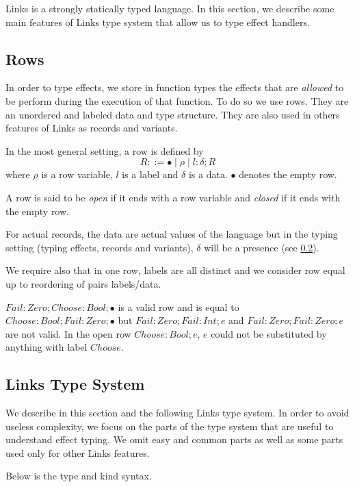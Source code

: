 \documentclass[11pt, nonacm=true, language=french, language=english]{acmart}
\begin{document}
Links is a strongly statically typed language. In this section, we describe some main features of Links type system that allow us to type effect handlers.

\subsection{Rows}
\label{sec:row-typ}

In order to type effects, we store in function types the effects that are \emph{allowed} to be perform during the execution of that function. To do so we use rows. They are an unordered and labeled data and type structure. They are also used in others features of Links as records and variants.

In the most general setting, a row is defined by
\[
  R ::= \bullet \mid \rho \mid l:\delta;R
\]
where $\rho$ is a row variable, $l$ is a label and $\delta$ is a data. $\bullet$ denotes the empty row.

A row is said to be \emph{open} if it ends with a row variable and \emph{closed} if it ends with the empty row.

For actual records, the data are actual values of the language but in the typing setting (typing effects, records and variants), $\delta$ will be a presence (see \ref{sec:links-typ}).

We require also that in one row, labels are all distinct and we consider row equal up to reordering of pairs labels/data.

\begin{ex}
  $Fail:Zero; Choose:Bool; \bullet$ is a valid row and is equal to $Choose:Bool; Fail:Zero; \bullet$ but $Fail:Zero; Fail:Int; e$ and $Fail:Zero; Fail:Zero; e$ are not valid. In the open row $Choose:Bool; e$, $e$ could not be substituted by anything with label $Choose$.
\end{ex}


\subsection{Links Type System}
\label{sec:links-typ}

We describe in this section and the following Links type system. In order to avoid useless complexity, we focus on the parts of the type system that are useful to understand effect typing. We omit easy and common parts as well as some parts used only for other Links features.

Below is the type and kind syntax.
\end{document}
